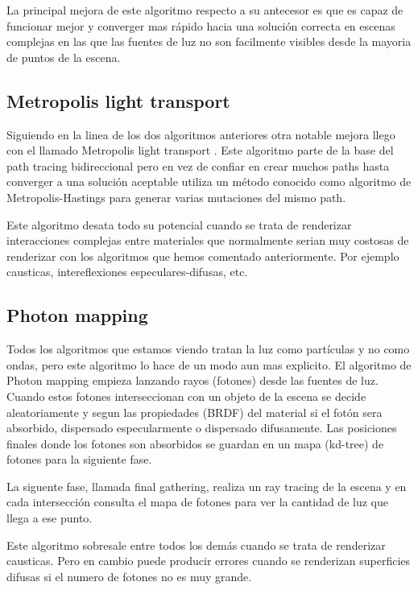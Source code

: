 \medskip
La principal mejora de este algoritmo respecto a su antecesor es que es capaz de funcionar mejor y converger mas rápido hacia una solución correcta en escenas complejas en las que las fuentes de luz no son facilmente visibles desde la mayoria de puntos de la escena.

\subsection{Metropolis light transport}

Siguiendo en la linea de los dos algoritmos anteriores otra notable mejora llego con el llamado Metropolis light transport \cite{Veach1997}. Este algoritmo parte de la base del path tracing bidireccional pero en vez de confiar en crear muchos paths hasta converger a una solución aceptable utiliza un método conocido como algoritmo de Metropolis-Hastings para generar varias mutaciones del mismo path. 

\medskip
Este algoritmo desata todo su potencial cuando se trata de renderizar interacciones complejas entre materiales que normalmente serian muy costosas de renderizar con los algoritmos que hemos comentado anteriormente. Por ejemplo causticas, intereflexiones especulares-difusas, etc.

\clearpage

\subsection{Photon mapping}

Todos los algoritmos que estamos viendo tratan la luz como partículas y no como ondas, pero este algoritmo lo hace de un modo aun mas explicito.
El algoritmo de Photon mapping \cite{Jensen1996} empieza lanzando rayos (fotones) desde las fuentes de luz. Cuando estos fotones interseccionan con un objeto de la escena se decide aleatoriamente y segun las propiedades (BRDF) del material si el fotón sera absorbido, dispersado especularmente o dispersado difusamente. Las posiciones finales donde los fotones son absorbidos se guardan en un mapa (kd-tree) de fotones para la siguiente fase.

\medskip
La siguente fase, llamada final gathering, realiza un ray tracing de la escena y en cada intersección consulta el mapa de fotones para ver la cantidad de luz que llega a ese punto.

\medskip
Este algoritmo sobresale entre todos los demás cuando se trata de renderizar causticas. Pero en cambio puede producir errores cuando se renderizan superficies difusas si el numero de fotones no es muy grande.


